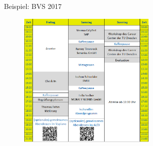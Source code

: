 \documentclass[
]{beamer}
\begin{document}
\begin{frame}{Beispiel: BVS 2017}
  \begin{figure}
   \centering
   \includegraphics[width=0.60\textwidth]{figure/programm_bvs2017}
  \end{figure}
\end{frame}
\end{document}
